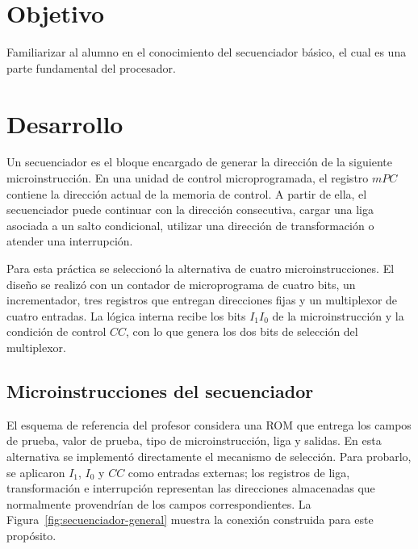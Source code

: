 \documentclass[letterpaper,12pt]{article}
\begin{document}

\newpage

\section{Objetivo}

Familiarizar al alumno en el conocimiento del secuenciador básico, el cual es una parte fundamental del procesador.

\section{Desarrollo}

Un secuenciador es el bloque encargado de generar la dirección de la siguiente microinstrucción. En una unidad de control microprogramada, el registro $mPC$ contiene la dirección actual de la memoria de control. A partir de ella, el secuenciador puede continuar con la dirección consecutiva, cargar una liga asociada a un salto condicional, utilizar una dirección de transformación o atender una interrupción.

Para esta práctica se seleccionó la alternativa de cuatro microinstrucciones. El diseño se realizó con un contador de microprograma de cuatro bits, un incrementador, tres registros que entregan direcciones fijas y un multiplexor de cuatro entradas. La lógica interna recibe los bits $I_1I_0$ de la microinstrucción y la condición de control $CC$, con lo que genera los dos bits de selección del multiplexor.

\subsection{Microinstrucciones del secuenciador}

El esquema de referencia del profesor considera una ROM que entrega los campos de prueba, valor de prueba, tipo de microinstrucción, liga y salidas. En esta alternativa se implementó directamente el mecanismo de selección. Para probarlo, se aplicaron $I_1$, $I_0$ y $CC$ como entradas externas; los registros de liga, transformación e interrupción representan las direcciones almacenadas que normalmente provendrían de los campos correspondientes. La Figura~\ref{fig:secuenciador-general} muestra la conexión construida para este propósito.
\end{document}
